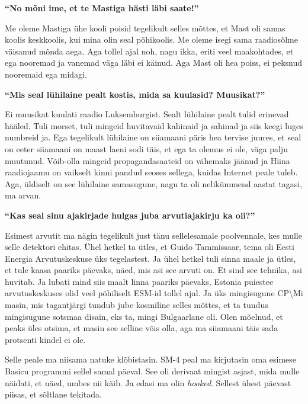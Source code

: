 \textbf{\enquote{No mõni ime, et te Mastiga hästi läbi saate!}}

Me oleme Mastiga ühe kooli poisid tegelikult selles mõttes, et Mast oli samas koolis keskkoolis, kui mina olin seal põhikoolis. Me oleme isegi sama raadiosõlme väisanud mõnda aega. Aga tollel ajal noh, nagu ikka, eriti veel maakohtades, et ega nooremad ja vanemad väga läbi ei käinud. Aga Mast oli hea poiss, ei peksnud nooremaid ega midagi. 

\textbf{\enquote{Mis seal lühilaine pealt kostis, mida sa kuulasid? Muusikat?}}

Ei muusikat kuulati raadio Luksemburgist. Sealt lühilaine pealt tulid erinevad hääled. Tuli morset, tuli mingeid huvitavaid kahinaid ja sahinad ja siis keegi luges numbreid ja. Ega tegelikult lühilaine on siiamaani päris hea tervise juures, et seal on  eeter siiamaani on  maast laeni sodi täis, et ega ta olemus ei ole, väga palju muutunud. Võib-olla mingeid propagandasaateid on vähemaks jäänud ja Hiina raadiojaamu on vaikselt kinni pandud seoses sellega, kuidas Internet peale tuleb. Aga, üldiselt on see lühilaine samasugune, nagu ta oli nelikümmend aastat tagasi, ma arvan.

\textbf{\enquote{Kas seal sinu ajakirjade hulgas juba arvutiajakirju ka oli?}}

Esimest arvutit ma nägin tegelikult just tänu sellelesamale poolvennale, kes mulle selle detektori ehitas. Ühel hetkel ta ütles, et Guido Tammissaar, tema oli Eesti Energia Arvutuskeskuse üks tegelastest. Ja ühel hetkel tuli sinna maale ja ütles, et tule kaasa paariks päevaks, näed, mis asi see arvuti on. Et sind see tehnika, asi huvitab. Ja lubati mind siis maalt linna paariks päevaks, Estonia puiestee arvutuskeskuses olid veel põhiliselt ESM-id tollel ajal. Ja üks mingisugune CP\textbackslash Mi masin, mis tagantjärgi tundub jube kosmiline selles mõttes, et ta tundus mingisugune sotsmaa disain, eks ta, mingi Bulgaarlane oli. Olen mõelnud, et peaks üles otsima, et  masin see selline võis olla, aga ma siiamaani täis sada protsenti kindel ei ole. 

Selle peale ma niisama natuke klõbistasin. SM-4 peal ma kirjutasin oma esimese Basicu programmi sellel samal päeval. See oli derivaat mingist asjast, mida mulle näidati, et näed, umbes nii käib. Ja edasi ma olin \emph{hooked}. Sellest ühest päevast piisas, et sõltlane tekitada. 

